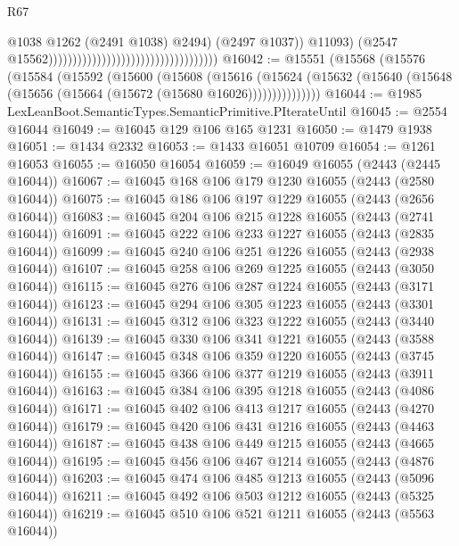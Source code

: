 \begin{lexlean}{R67}
\begin{coremodule}
                                                                              @1038
                                                                              @1262
                                                                              (@2491 @1038)
                                                                              @2494)
                                                                            (@2497 @1037))
                                                                          @11093)
                                                                        (@2547
                                                                          @15562)))))))))))))))))))))))))))))))))))
@16042 := @15551
    (@15568
      (@15576
        (@15584
          (@15592
            (@15600
              (@15608
                (@15616
                  (@15624
                    (@15632 (@15640 (@15648 (@15656 (@15664 (@15672 (@15680 @16026)))))))))))))))
@16044 := @1985 LexLeanBoot.SemanticTypes.SemanticPrimitive.PIterateUntil
@16045 := @2554 @16044
@16049 := @16045 @129 @106 @165 @1231
@16050 := @1479 @1938
@16051 := @1434 @2332
@16053 := @1433 @16051 @10709
@16054 := @1261 @16053
@16055 := @16050 @16054
@16059 := @16049 @16055 (@2443 (@2445 @16044))
@16067 := @16045 @168 @106 @179 @1230 @16055 (@2443 (@2580 @16044))
@16075 := @16045 @186 @106 @197 @1229 @16055 (@2443 (@2656 @16044))
@16083 := @16045 @204 @106 @215 @1228 @16055 (@2443 (@2741 @16044))
@16091 := @16045 @222 @106 @233 @1227 @16055 (@2443 (@2835 @16044))
@16099 := @16045 @240 @106 @251 @1226 @16055 (@2443 (@2938 @16044))
@16107 := @16045 @258 @106 @269 @1225 @16055 (@2443 (@3050 @16044))
@16115 := @16045 @276 @106 @287 @1224 @16055 (@2443 (@3171 @16044))
@16123 := @16045 @294 @106 @305 @1223 @16055 (@2443 (@3301 @16044))
@16131 := @16045 @312 @106 @323 @1222 @16055 (@2443 (@3440 @16044))
@16139 := @16045 @330 @106 @341 @1221 @16055 (@2443 (@3588 @16044))
@16147 := @16045 @348 @106 @359 @1220 @16055 (@2443 (@3745 @16044))
@16155 := @16045 @366 @106 @377 @1219 @16055 (@2443 (@3911 @16044))
@16163 := @16045 @384 @106 @395 @1218 @16055 (@2443 (@4086 @16044))
@16171 := @16045 @402 @106 @413 @1217 @16055 (@2443 (@4270 @16044))
@16179 := @16045 @420 @106 @431 @1216 @16055 (@2443 (@4463 @16044))
@16187 := @16045 @438 @106 @449 @1215 @16055 (@2443 (@4665 @16044))
@16195 := @16045 @456 @106 @467 @1214 @16055 (@2443 (@4876 @16044))
@16203 := @16045 @474 @106 @485 @1213 @16055 (@2443 (@5096 @16044))
@16211 := @16045 @492 @106 @503 @1212 @16055 (@2443 (@5325 @16044))
@16219 := @16045 @510 @106 @521 @1211 @16055 (@2443 (@5563 @16044))

\end{coremodule}
\end{lexlean}
